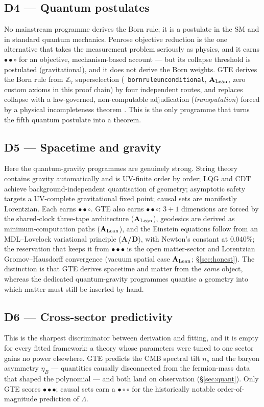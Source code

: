 \documentclass[11pt]{article}
\newcommand{\lean}[1]{%
  \penalty-100
  \begingroup\def\_{\textunderscore\allowbreak}\texttt{#1}\endgroup}
\newcommand{\CatAL}{\ensuremath{\textbf{A}_{\rm Lean}}}
\newcommand{\CatAD}{\textbf{A/D}}
\newcommand{\rFull}{\ensuremath{\bullet\bullet\bullet}}      %
\newcommand{\rStrong}{\ensuremath{\bullet\bullet\circ}}      %
\newcommand{\rPart}{\ensuremath{\bullet\circ\circ}}          %
\begin{document}
\subsection*{D4 --- Quantum postulates}
No mainstream programme derives the Born rule; it is a postulate in the SM and in
standard quantum mechanics.  Penrose objective reduction is the one alternative
that takes the measurement problem seriously as physics, and it earns \rStrong{}
for an objective, mechanism-based account --- but its collapse threshold is
postulated (gravitational), and it does not derive the Born weights.  GTE derives
the Born rule from $\mathbb{Z}_7$ superselection
(\mbox{\lean{born\_rule\_unconditional}}, \CatAL, zero custom axioms in this proof chain) by four
independent routes, and replaces collapse with a law-governed, non-computable
adjudication (\emph{transputation}) forced by a physical incompleteness theorem
\cite{SpivackPolynomialTransputation}.  This is the only programme that turns the
fifth quantum postulate into a theorem.

\subsection*{D5 --- Spacetime and gravity}
Here the quantum-gravity programmes are genuinely strong.  String theory contains
gravity automatically and is UV-finite order by order; LQG and CDT achieve
background-independent quantisation of geometry; asymptotic safety targets a
UV-complete gravitational fixed point; causal sets are manifestly Lorentzian.
Each earns \rStrong{}.  GTE also earns \rStrong{}: $3{+}1$ dimensions are forced by
the shared-clock three-tape architecture (\CatAL), geodesics are derived as
minimum-computation paths (\CatAL), and the Einstein equations follow from an
MDL--Lovelock variational principle (\CatAD), with Newton's constant at $0.040\%$;
the reservation that keeps it from \rFull{} is the open matter-sector and Lorentzian
Gromov--Hausdorff convergence (vacuum spatial case \CatAL;
§\ref{sec:honest}).  The distinction is that GTE derives
spacetime and matter from the \emph{same} object, whereas the dedicated
quantum-gravity programmes quantise a geometry into which matter must still be
inserted by hand.

\subsection*{D6 --- Cross-sector predictivity}
This is the sharpest discriminator between derivation and fitting, and it is empty
for every fitted framework: a theory whose parameters were tuned to one sector
gains no power elsewhere.  GTE predicts the CMB spectral tilt $n_s$ and the baryon
asymmetry $\eta_B$ --- quantities causally disconnected from the fermion-mass data
that shaped the polynomial --- and both land on observation (§\ref{sec:quant}).
Only GTE scores \rFull{}; causal sets earn a \rPart{} for the historically notable
order-of-magnitude prediction of $\Lambda$.
\end{document}
